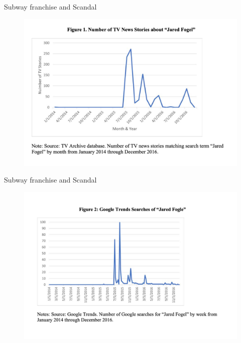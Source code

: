 \documentclass{beamer}
\begin{document}
\begin{frame}{Subway franchise and Scandal}

	\begin{figure}
	\includegraphics[scale=0.25]{./lecture_includes/subway_1.png}
	\end{figure}

\end{frame}


\begin{frame}{Subway franchise and Scandal}

	\begin{figure}
	\includegraphics[scale=0.25]{./lecture_includes/subway_2.png}
	\end{figure}

\end{frame}
\end{document}
